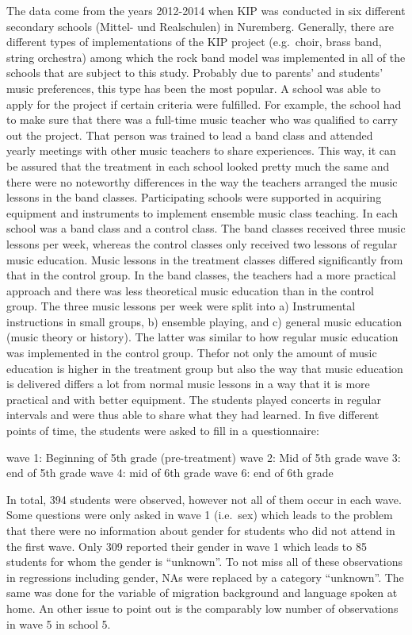 \documentclass[a4, 12pt]{article}
\begin{document}
\label{project}
The data come from the years 2012-2014 when KIP was conducted in six different secondary schools (Mittel- und Realschulen) in Nuremberg. Generally, there are different types of implementations of the KIP project (e.g.~choir, brass band, string orchestra) among which the rock band model was implemented in all of the schools that are subject to this study. Probably due to parents' and students' music preferences, this type has been the most popular. A school was able to apply for the project if certain criteria were fulfilled. For example, the school had to make sure that there was a full-time music teacher who was qualified to carry out the project. That person was trained to lead a band class and attended yearly meetings with other music teachers to share experiences. This way, it can be assured that the treatment in each school looked pretty much the same and there were no noteworthy differences in the way the teachers arranged the music lessons in the band classes. Participating schools were supported in acquiring equipment and instruments to implement ensemble music class teaching. In each school was a band class and a control class. The band classes received three music lessons per week, whereas the control classes only received two lessons of regular music education. Music lessons in the treatment classes differed significantly from that in the control group. In the band classes, the teachers had a more practical approach and there was less theoretical music education than in the control group. The three music lessons per week were split into a) Instrumental instructions in small groups, b) ensemble playing, and c) general music education (music theory or history). The latter was similar to how regular music education was implemented in the control group. Thefor not only the amount of music education is higher in the treatment group but also the way that music education is delivered differs a lot from normal music lessons in a way that it is more practical and with better equipment. The students played concerts in regular intervals and were thus able to share what they had learned. In five different points of time, the students were asked to fill in a questionnaire:

wave 1: Beginning of 5th grade (pre-treatment)
wave 2: Mid of 5th grade
wave 3: end of 5th grade
wave 4: mid of 6th grade
wave 6: end of 6th grade

In total, 394 students were observed, however not all of them occur in each wave. Some questions were only asked in wave 1 (i.e.~sex) which leads to the problem that there were no information about gender for students who did not attend in the first wave. Only 309 reported their gender in wave 1 which leads to 85 students for whom the gender is ``unknown''. To not miss all of these observations in regressions including gender, NAs were replaced by a category ``unknown''. The same was done for the variable of migration background and language spoken at home. An other issue to point out is the comparably low number of observations in wave 5 in school 5.
\end{document}

